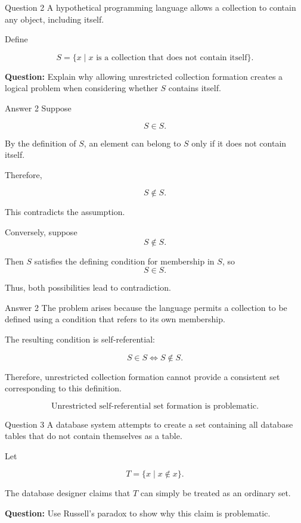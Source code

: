 
\begin{frame}{Question 2}
A hypothetical programming language allows a collection to contain any object, including itself.

Define

$$
S=\{x\mid x\text{ is a collection that does not contain itself}\}.
$$

\textbf{Question:} Explain why allowing unrestricted collection formation creates a logical problem when considering whether $S$ contains itself.
\end{frame}

\begin{frame}{Answer 2}
Suppose

$$
S\in S.
$$

By the definition of $S$, an element can belong to $S$ only if it does not contain itself.

Therefore,

$$
S\notin S.
$$

This contradicts the assumption.

Conversely, suppose
$$
S\notin S.
$$

Then $S$ satisfies the defining condition for membership in $S$, so
$$
S\in S.
$$

Thus, both possibilities lead to contradiction.
\end{frame}

\begin{frame}{Answer 2}
The problem arises because the language permits a collection to be defined using a condition that refers to its own membership.

The resulting condition is self-referential:

$$
S\in S
\iff
S\notin S.
$$

Therefore, unrestricted collection formation cannot provide a consistent set corresponding to this definition.

$$
\boxed{\text{Unrestricted self-referential set formation is problematic.}}
$$

\end{frame}


\begin{frame}{Question 3}
A database system attempts to create a set containing all database tables that do not contain themselves as a table.

Let

$$
T=\{x\mid x\notin x\}.
$$

The database designer claims that $T$ can simply be treated as an ordinary set.

\textbf{Question:} Use Russell's paradox to show why this claim is problematic.
\end{frame}

